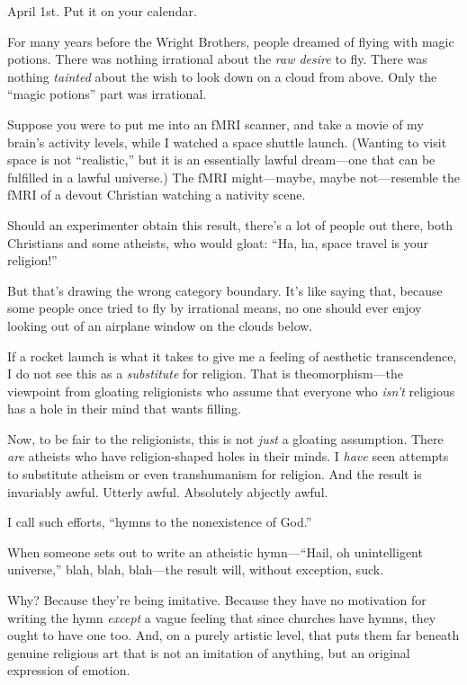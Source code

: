 {
 April 1st. Put it on your calendar.}

\myendsectiontext


{
 For many years before the Wright Brothers, people dreamed of
flying with magic potions. There was nothing irrational about the
\textit{raw desire} to fly. There was nothing \textit{tainted} about
the wish to look down on a cloud from above. Only the
``magic potions'' part was
irrational.}

{
 Suppose you were to put me into an fMRI scanner, and take a movie
of my brain's activity levels, while I watched a space
shuttle launch. (Wanting to visit space is not
``realistic,'' but it is an
essentially lawful dream---one that can be fulfilled in a lawful
universe.) The fMRI might---maybe, maybe not---resemble the fMRI of a
devout Christian watching a nativity scene.}

{
 Should an experimenter obtain this result, there's
a lot of people out there, both Christians and some atheists, who would
gloat: ``Ha, ha, space travel is your
religion!''}

{
 But that's drawing the wrong category boundary.
It's like saying that, because some people once tried
to fly by irrational means, no one should ever enjoy looking out of an
airplane window on the clouds below.}

{
 If a rocket launch is what it takes to give me a feeling of
aesthetic transcendence, I do not see this as a \textit{substitute} for
religion. That is theomorphism---the viewpoint from gloating
religionists who assume that everyone who
\textit{isn't} religious has a hole in their mind that
wants filling.}

{
 Now, to be fair to the religionists, this is not \textit{just} a
gloating assumption. There \textit{are} atheists who have
religion-shaped holes in their minds. I \textit{have} seen attempts to
substitute atheism or even transhumanism for religion. And the result
is invariably awful. Utterly awful. Absolutely abjectly awful.}

{
 I call such efforts, ``hymns to the nonexistence
of God.''}

{
 When someone sets out to write an atheistic
hymn---``Hail, oh unintelligent
universe,'' blah, blah, blah---the result will,
without exception, suck.}

{
 Why? Because they're being imitative. Because they
have no motivation for writing the hymn \textit{except} a vague feeling
that since churches have hymns, they ought to have one too. And, on a
purely artistic level, that puts them far beneath genuine religious art
that is not an imitation of anything, but an original expression of
emotion.}

